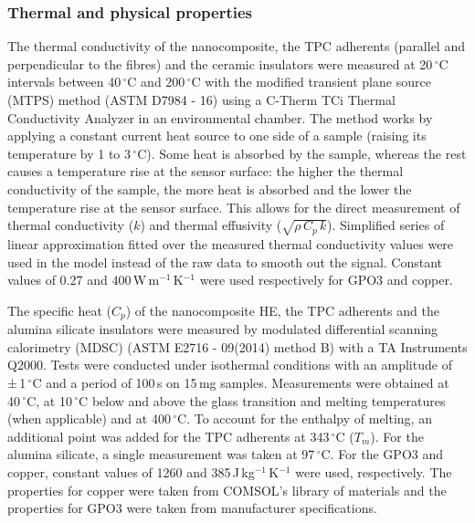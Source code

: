 \documentclass[review,times,sagev,doublespace]{sagej}
\begin{document}
		\subsubsection{Thermal and physical properties}

The thermal conductivity of the nanocomposite, the TPC adherents (parallel and perpendicular to the fibres) and the ceramic insulators were measured at 20\,$^{\circ}$C intervals between 40\,$^{\circ}$C and 200\,$^{\circ}$C with the modified transient plane source (MTPS) method (ASTM D7984 - 16) using a C-Therm TCi Thermal Conductivity Analyzer in an environmental chamber.
{
The method works by applying a constant current heat source to one side of a sample (raising its temperature by 1 to 3\,$^{\circ}$C). 
Some heat is absorbed by the sample, whereas the rest causes a temperature rise at the sensor surface: the higher the thermal conductivity of the sample, the more heat is absorbed and the lower the temperature rise at the sensor surface. 
This allows for the direct measurement of thermal conductivity ($k$) and thermal effusivity ($\sqrt{\rho \, C_p \, k}$).  
}
Simplified series of linear approximation fitted over the measured thermal conductivity values were used in the model instead of the raw data to smooth out the signal. 
Constant values of 0.27 and \mbox{400\,W\,m$^{-1}$\,K$^{-1}$} were used respectively for GPO3 and copper. 

The specific heat ($C_p$) of the nanocomposite HE, the TPC adherents and the alumina silicate insulators were measured by modulated differential scanning calorimetry (MDSC) (ASTM E2716 - 09(2014) { method B}) with a TA Instruments Q2000. { Tests were conducted under isothermal conditions with an amplitude of ±\,1\,$^{\circ}$C and a period of 100\,s on 15\,mg samples.} 
Measurements were obtained at 40\,$^{\circ}$C, at 10\,$^{\circ}$C below and above the glass transition and melting temperatures (when applicable) and at 400\,$^{\circ}$C. 
To account for the enthalpy of melting, an additional point was added for the TPC adherents at 343\,$^{\circ}$C ($T_m$). 
For the alumina silicate, a single measurement was taken at 97\,$^{\circ}$C. 
For the GPO3 and copper, constant values of 1260 and \mbox{385\,J\,kg$^{-1}$\,K$^{-1}$} were used, respectively. 
{
The properties for copper were taken from COMSOL's library of materials and the properties for GPO3 were taken from manufacturer specifications. }
\end{document}
